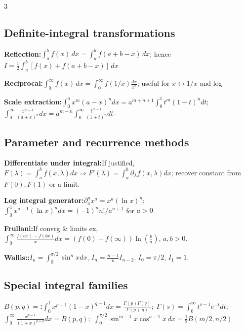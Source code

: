 \documentclass[10pt]{article}
\newenvironment{cheatitems}{\par\vspace{-2pt}}{\par\vspace{-2pt}}
\newcommand{\cheatrow}[2]{%
  \par\noindent\textbf{#1:}\nobreak\hspace{0.25em}#2\par
}
\begin{document}
\begin{multicols}{3}
\subsection*{Definite-integral transformations}
\begin{cheatitems}
\cheatrow{Reflection}{$\int_a^b f(x)\,dx\!=\!\int_a^b f(a+b-x)\,dx$; hence $I\!=\!\frac12\int_a^b[f(x)+f(a+b-x)]\,dx$}
\cheatrow{Reciprocal}{$\int_0^\infty f(x)\,dx\!=\!\int_0^\infty f(1/x)\frac{dx}{x^2}$; useful for $x\leftrightarrow1/x$ and log}
\cheatrow{Scale extraction}{$\int_0^a x^m(a-x)^n dx\!=\!a^{m+n+1}\int_0^1t^m(1-t)^n dt$; $\int_0^\infty\frac{x^{m-1}}{(a+x)^n}dx\!=\!a^{m-n}\int_0^\infty\frac{t^{m-1}}{(1+t)^n}dt$.}
\end{cheatitems}

\subsection*{Parameter and recurrence methods}
\vspace{2pt}
\begin{cheatitems}
\cheatrow{Differentiate under integral}{If justified, $F(\lambda)\!=\!\int_a^b f(x,\lambda)dx\Rightarrow F'(\lambda)\!=\!\int_a^b\partial_\lambda f(x,\lambda)dx$; recover constant from $F(0),F(1)$ or a limit.}
\cheatrow{Log integral generator}{$\partial_a^n x^a\!=\!x^a(\ln x)^n$; $\int_0^1 x^{a-1}(\ln x)^n dx\!=\!(-1)^n n!/a^{n+1}$ for $a>0$.}
\cheatrow{Frullani}{If convrg \& limits ex, $\displaystyle\int_0^\infty\! \!\! \frac{f(ax)-f(bx)}{x}dx\!\!=\!\!(f(0)\!-\!f(\infty))\ln(\frac{b}{a})$, $a,b>0$.}
\cheatrow{Wallis:} {$I_n\!=\!\int_0^{\pi/2}\sin^n xdx$, $I_n\!=\!\frac{n-1}{n}I_{n-2}$, $I_0\!=\!\pi/2$, $I_1\!=\!1$.}
\end{cheatitems}
\subsection*{Special integral families}
\begin{cheatitems}

\cheatrow{$B(p,q)\!=$}{$\displaystyle \!\int_0^1x^{p-1}(1-x)^{q-1}dx\!=\!\frac{\Gamma(p)\Gamma(q)}{\Gamma(p+q)};\; \Gamma(s)\!=\!\int_0^\infty t^{s-1}e^{-t}dt;$ \\
\vspace{-2pt}
$\displaystyle
\int_0^\infty \!\!\!\!\frac{x^{p-1}}{(1+x)^{p+q}}dx
\!=\!B(p,q)
; $
$\displaystyle\int_0^{\pi/2}\!\!\!\!\!\!\sin^{m-1}x\cos^{n-1}x\,dx\!=\!\frac12B(m/2,n/2)$}




\end{cheatitems}
\end{multicols}
\end{document}
